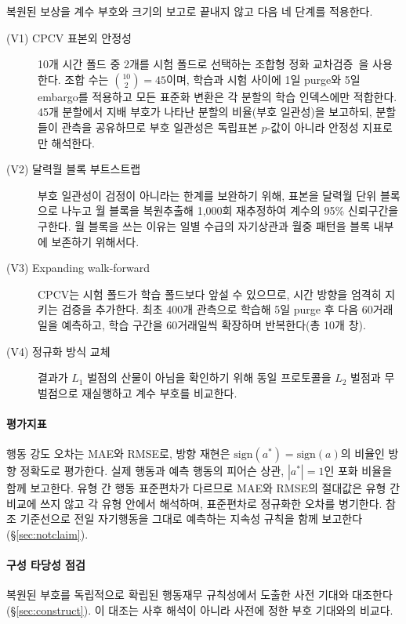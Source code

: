 복원된 보상을 계수 부호와 크기의 보고로 끝내지 않고 다음 네 단계를 적용한다.

\begin{description}
\item[(V1) CPCV 표본외 안정성] 10개 시간 폴드 중 2개를 시험 폴드로 선택하는
조합형 정화 교차검증~\cite{lopez2018advances}을 사용한다. 조합 수는
$\binom{10}{2}=45$이며, 학습과 시험 사이에 1일 purge와 5일 embargo를 적용하고
모든 표준화 변환은 각 분할의 학습 인덱스에만 적합한다. 45개 분할에서 지배 부호가
나타난 분할의 비율(부호 일관성)을 보고하되, 분할들이 관측을 공유하므로 부호
일관성은 독립표본 $p$-값이 아니라 안정성 지표로만 해석한다.

\item[(V2) 달력월 블록 부트스트랩] 부호 일관성이 검정이 아니라는 한계를
보완하기 위해, 표본을 달력월 단위 블록으로 나누고 월 블록을 복원추출해 1{,}000회
재추정하여 계수의 95\% 신뢰구간을 구한다. 월 블록을 쓰는 이유는 일별 수급의
자기상관과 월중 패턴을 블록 내부에 보존하기 위해서다.

\item[(V3) Expanding walk-forward] CPCV는 시험 폴드가 학습 폴드보다 앞설 수
있으므로, 시간 방향을 엄격히 지키는 검증을 추가한다. 최초 400개 관측으로 학습해
5일 purge 후 다음 60거래일을 예측하고, 학습 구간을 60거래일씩 확장하며
반복한다(총 10개 창).

\item[(V4) 정규화 방식 교체] 결과가 $L_1$ 벌점의 산물이 아님을 확인하기 위해
동일 프로토콜을 $L_2$ 벌점과 무벌점으로 재실행하고 계수 부호를 비교한다.
\end{description}

\paragraph{평가지표}
행동 강도 오차는 MAE와 RMSE로, 방향 재현은
$\mathrm{sign}(a^{*})=\mathrm{sign}(a)$의 비율인 방향 정확도로 평가한다. 실제
행동과 예측 행동의 피어슨 상관, $|a^{*}|=1$인 포화 비율을 함께 보고한다. 유형 간
행동 표준편차가 다르므로 MAE와 RMSE의 절대값은 유형 간 비교에 쓰지 않고 각 유형
안에서 해석하며, 표준편차로 정규화한 오차를 병기한다. 참조 기준선으로 전일
자기행동을 그대로 예측하는 지속성 규칙을 함께 보고한다(\S\ref{sec:notclaim}).

\paragraph{구성 타당성 점검}
복원된 부호를 독립적으로 확립된 행동재무 규칙성에서 도출한 사전 기대와
대조한다(\S\ref{sec:construct}). 이 대조는 사후 해석이 아니라 사전에 정한 부호
기대와의 비교다.

